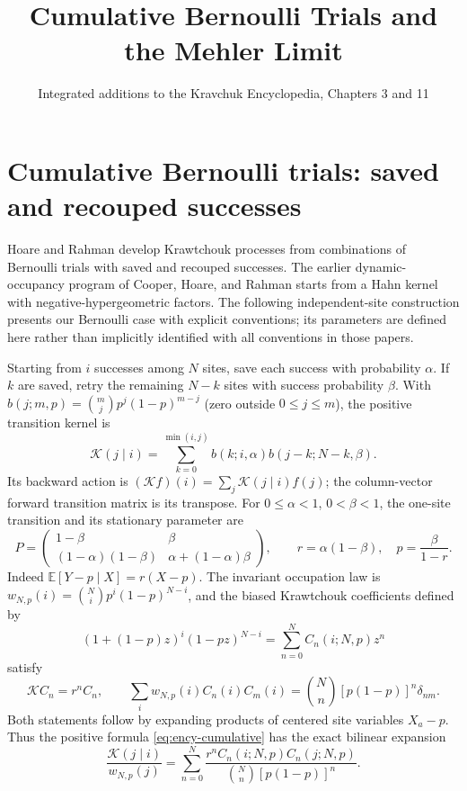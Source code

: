 \documentclass[11pt,reqno]{amsart}
\title{Cumulative Bernoulli Trials and the Mehler Limit}
\date{Integrated additions to the Kravchuk Encyclopedia, Chapters 3 and 11}
\begin{document}
\maketitle
\section{Cumulative Bernoulli trials: saved and recouped successes}
\label{sec:cumulative-bernoulli}
Hoare and Rahman \cite{HoareRahman1984} develop Krawtchouk processes
from combinations of Bernoulli trials with saved and recouped successes.
The earlier dynamic-occupancy program of Cooper, Hoare, and Rahman
\cite{CooperHoareRahman1977} starts from a Hahn kernel with
negative-hypergeometric factors. The following independent-site
construction presents our Bernoulli case with explicit conventions;
its parameters are defined here rather than implicitly identified with
all conventions in those papers.

Starting from $i$ successes among $N$ sites, save each success with
probability $\alpha$. If $k$ are saved, retry the remaining $N-k$ sites
with success probability $\beta$. With
$b(j;m,p)=\binom mjp^j(1-p)^{m-j}$ (zero outside $0\le j\le m$), the
positive transition kernel is
\begin{equation}\label{eq:ency-cumulative}
\mathcal K(j\mid i)=\sum_{k=0}^{\min(i,j)}
b(k;i,\alpha)b(j-k;N-k,\beta).
\end{equation}
Its backward action is $(\mathcal Kf)(i)=\sum_j\mathcal K(j\mid i)f(j)$;
the column-vector forward transition matrix is its transpose.
For $0\le\alpha<1$, $0<\beta<1$, the one-site transition and its
stationary parameter are
\[
P=\begin{pmatrix}1-\beta&\beta\\
(1-\alpha)(1-\beta)&\alpha+(1-\alpha)\beta\end{pmatrix},\qquad
r=\alpha(1-\beta),\quad p=\frac{\beta}{1-r}.
\]
Indeed $\mathbb E[Y-p\mid X]=r(X-p)$. The invariant occupation law is
$w_{N,p}(i)=\binom Ni p^i(1-p)^{N-i}$, and the biased Krawtchouk
coefficients defined by
\[
(1+(1-p)z)^i(1-pz)^{N-i}=\sum_{n=0}^NC_n(i;N,p)z^n
\]
satisfy
\[
\mathcal KC_n=r^nC_n,\qquad
\sum_iw_{N,p}(i)C_n(i)C_m(i)=\binom Nn[p(1-p)]^n\delta_{nm}.
\]
Both statements follow by expanding products of centered site variables
$X_a-p$. Thus the positive formula \eqref{eq:ency-cumulative} has the
exact bilinear expansion
\begin{equation}\label{eq:ency-cumulative-spectral}
\frac{\mathcal K(j\mid i)}{w_{N,p}(j)}
=\sum_{n=0}^N\frac{r^nC_n(i;N,p)C_n(j;N,p)}{\binom Nn[p(1-p)]^n}.
\end{equation}
\end{document}
